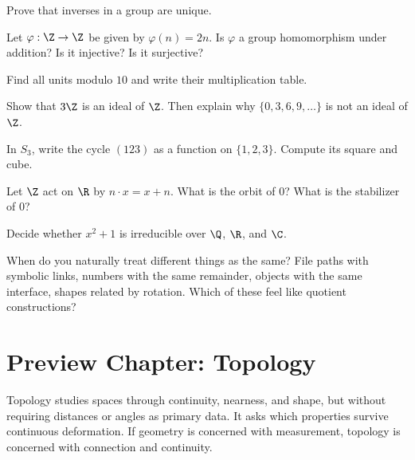 \begin{exercise}
Prove that inverses in a group are unique.
\end{exercise}

\begin{exercise}
Let $\varphi:\Z\to\Z$ be given by $\varphi(n)=2n$. Is $\varphi$ a group
homomorphism under addition? Is it injective? Is it surjective?
\end{exercise}

\begin{exercise}
Find all units modulo $10$ and write their multiplication table.
\end{exercise}

\begin{exercise}
Show that $3\Z$ is an ideal of $\Z$. Then explain why $\{0,3,6,9,\ldots\}$ is
not an ideal of $\Z$.
\end{exercise}

\begin{exercise}
In $S_3$, write the cycle $(123)$ as a function on $\{1,2,3\}$. Compute its
square and cube.
\end{exercise}

\begin{exercise}
Let $\Z$ act on $\R$ by $n\cdot x=x+n$. What is the orbit of $0$? What is the
stabilizer of $0$?
\end{exercise}

\begin{exercise}
Decide whether $x^2+1$ is irreducible over $\Q$, $\R$, and $\C$.
\end{exercise}

\begin{walkbox}
When do you naturally treat different things as the same? File paths with
symbolic links, numbers with the same remainder, objects with the same interface,
shapes related by rotation. Which of these feel like quotient constructions?
\end{walkbox}

\section{Preview Chapter: Topology}

Topology studies spaces through continuity, nearness, and shape, but without
requiring distances or angles as primary data. It asks which properties survive
continuous deformation. If geometry is concerned with measurement, topology is
concerned with connection and continuity.

